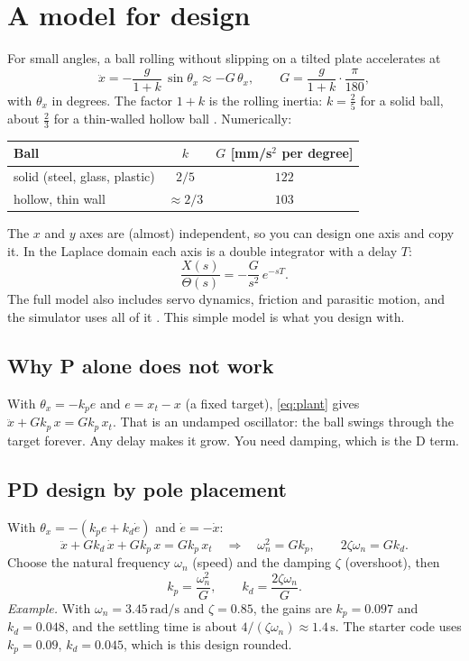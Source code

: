 \documentclass[10pt,a4paper]{article}
\newcommand{\un}[1]{\,\mathrm{#1}}
\begin{document}
\section{A model for design}\label{sec:model}
For small angles, a ball rolling without slipping on a tilted plate accelerates at
\begin{equation}
  \ddot x=-\frac{g}{1+k}\,\sin\theta_x\approx-G\,\theta_x,\qquad
  G=\frac{g}{1+k}\cdot\frac{\pi}{180},
  \label{eq:plant}
\end{equation}
with $\theta_x$ in degrees. The factor $1+k$ is the rolling inertia: $k=\frac25$ for a solid ball,
about $\frac23$ for a thin-walled hollow ball \citep{bbpphysics}. Numerically:
\begin{center}
\begin{tabular}{lcc}
\toprule
Ball & $k$ & $G$ [mm/s$^2$ per degree]\\
\midrule
solid (steel, glass, plastic) & $2/5$ & $122$\\
hollow, thin wall & $\approx2/3$ & $103$\\
\bottomrule
\end{tabular}
\end{center}
The $x$ and $y$ axes are (almost) independent, so you can design one axis and copy it. In the
Laplace domain each axis is a double integrator with a delay $T$:
\begin{equation}
  \frac{X(s)}{\Theta(s)}=-\frac{G}{s^2}\,e^{-sT}.
\end{equation}
The full model also includes servo dynamics, friction and parasitic motion, and the simulator
uses all of it \citep{bbpphysics}. This simple model is what you design with.

\subsection{Why P alone does not work}
With $\theta_x=-k_pe$ and $e=x_t-x$ (a fixed target), \eqref{eq:plant} gives
$\ddot x+Gk_p\,x=Gk_p\,x_t$. That is an undamped oscillator: the ball swings through the target
forever. Any delay makes it grow. You need damping, which is the D term.

\subsection{PD design by pole placement}
With $\theta_x=-(k_pe+k_d\dot e)$ and $\dot e=-\dot x$:
\begin{equation}
  \ddot x+Gk_d\,\dot x+Gk_p\,x=Gk_p\,x_t
  \quad\Longrightarrow\quad
  \omega_n^2=Gk_p,\qquad2\zeta\omega_n=Gk_d.
\end{equation}
Choose the natural frequency $\omega_n$ (speed) and the damping $\zeta$ (overshoot), then
\begin{equation}
  k_p=\frac{\omega_n^2}{G},\qquad k_d=\frac{2\zeta\omega_n}{G}.
\end{equation}
\emph{Example.} With $\omega_n=3.45\un{rad/s}$ and $\zeta=0.85$, the gains are $k_p=0.097$ and
$k_d=0.048$, and the settling time is about $4/(\zeta\omega_n)\approx1.4\un{s}$. The starter code
uses $k_p=0.09$, $k_d=0.045$, which is this design rounded.
\end{document}
